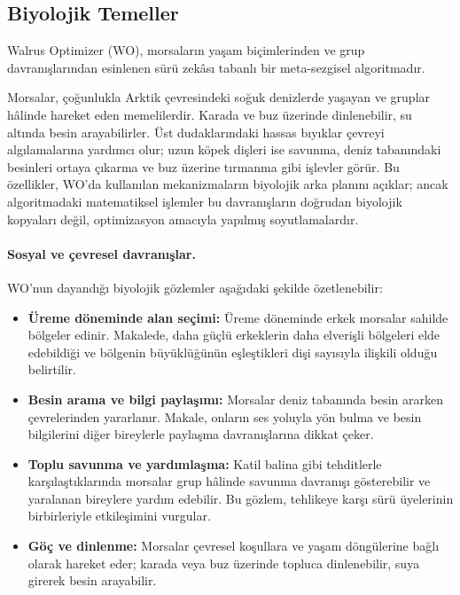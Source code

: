 \subsection{Biyolojik Temeller}

Walrus Optimizer (WO), morsaların yaşam biçimlerinden ve grup
davranışlarından esinlenen sürü zekâsı tabanlı bir meta-sezgisel
algoritmadır.

Morsalar, çoğunlukla Arktik çevresindeki soğuk denizlerde yaşayan ve
gruplar hâlinde hareket eden memelilerdir. Karada ve buz üzerinde
dinlenebilir, su altında besin arayabilirler. Üst dudaklarındaki hassas
bıyıklar çevreyi algılamalarına yardımcı olur; uzun köpek dişleri ise
savunma, deniz tabanındaki besinleri ortaya çıkarma ve buz üzerine
tırmanma gibi işlevler görür. Bu özellikler, WO'da kullanılan
mekanizmaların biyolojik arka planını açıklar; ancak algoritmadaki
matematiksel işlemler bu davranışların doğrudan biyolojik kopyaları
değil, optimizasyon amacıyla yapılmış soyutlamalardır.

\paragraph{Sosyal ve çevresel davranışlar.}
WO'nun dayandığı biyolojik gözlemler aşağıdaki şekilde özetlenebilir:

\begin{itemize}
    \item \textbf{Üreme döneminde alan seçimi:} Üreme döneminde erkek
    morsalar sahilde bölgeler edinir. Makalede, daha güçlü erkeklerin
    daha elverişli bölgeleri elde edebildiği ve bölgenin büyüklüğünün
    eşleştikleri dişi sayısıyla ilişkili olduğu belirtilir.

    \item \textbf{Besin arama ve bilgi paylaşımı:} Morsalar deniz
    tabanında besin ararken çevrelerinden yararlanır. Makale, onların
    ses yoluyla yön bulma ve besin bilgilerini diğer bireylerle paylaşma
    davranışlarına dikkat çeker.

    \item \textbf{Toplu savunma ve yardımlaşma:} Katil balina gibi
    tehditlerle karşılaştıklarında morsalar grup hâlinde savunma
    davranışı gösterebilir ve yaralanan bireylere yardım edebilir.
    Bu gözlem, tehlikeye karşı sürü üyelerinin birbirleriyle
    etkileşimini vurgular.

    \item \textbf{Göç ve dinlenme:} Morsalar çevresel koşullara ve
    yaşam döngülerine bağlı olarak hareket eder; karada veya buz
    üzerinde topluca dinlenebilir, suya girerek besin arayabilir.
\end{itemize}

